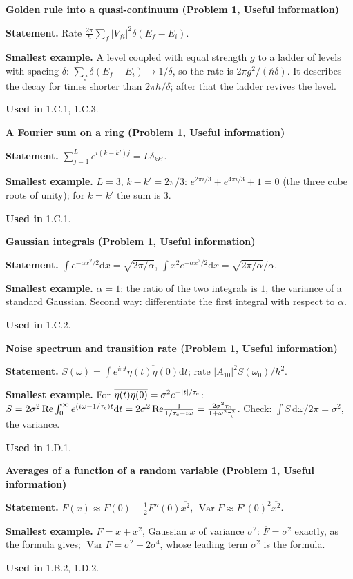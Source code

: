 \documentclass[11pt,a4paper]{article}
\newcommand{\dd}{\mathrm d}
\newcommand{\avg}[1]{\overline{#1}}
\newcommand{\Var}{\operatorname{Var}}
\newcommand{\smallheading}[1]{\par\Needspace{6\baselineskip}\medskip\textbf{#1}\par}
\begin{document}
\smallheading{Golden rule into a quasi-continuum (Problem 1, Useful information)}
\textbf{Statement.} Rate $\frac{2\pi}\hbar\sum_f|V_{fi}|^2\delta(E_f-E_i)$.\par
\textbf{Smallest example.} A level coupled with equal strength $g$ to a ladder of levels with spacing $\delta$: $\sum_f\delta(E_f-E_i)\to1/\delta$, so the rate is $2\pi g^2/(\hbar\delta)$. It describes the decay for times shorter than $2\pi\hbar/\delta$; after that the ladder revives the level.\par
\textbf{Used in} 1.C.1, 1.C.3.

\smallheading{A Fourier sum on a ring (Problem 1, Useful information)}
\textbf{Statement.} $\sum_{j=1}^Le^{i(k-k')j}=L\delta_{kk'}$.\par
\textbf{Smallest example.} $L=3$, $k-k'=2\pi/3$: $e^{2\pi i/3}+e^{4\pi i/3}+1=0$ (the three cube roots of unity); for $k=k'$ the sum is 3.\par
\textbf{Used in} 1.C.1.

\smallheading{Gaussian integrals (Problem 1, Useful information)}
\textbf{Statement.} $\int e^{-\alpha x^2/2}\dd x=\sqrt{2\pi/\alpha}$, $\int x^2e^{-\alpha x^2/2}\dd x=\sqrt{2\pi/\alpha}/\alpha$.\par
\textbf{Smallest example.} $\alpha=1$: the ratio of the two integrals is $1$, the variance of a standard Gaussian. Second way: differentiate the first integral with respect to $\alpha$.\par
\textbf{Used in} 1.C.2.

\smallheading{Noise spectrum and transition rate (Problem 1, Useful information)}
\textbf{Statement.} $S(\omega)=\int e^{i\omega t}\avg{\eta(t)\eta(0)}\dd t$; rate $|A_{10}|^2S(\omega_0)/\hbar^2$.\par
\textbf{Smallest example.} For $\avg{\eta(t)\eta(0)}=\sigma^2e^{-|t|/\tau_{\rm c}}$: $S=2\sigma^2\,\mathrm{Re}\int_0^\infty e^{(i\omega-1/\tau_{\rm c})t}\dd t=2\sigma^2\,\mathrm{Re}\frac1{1/\tau_{\rm c}-i\omega}=\frac{2\sigma^2\tau_{\rm c}}{1+\omega^2\tau_{\rm c}^2}$. Check: $\int S\,\dd\omega/2\pi=\sigma^2$, the variance.\par
\textbf{Used in} 1.D.1.

\smallheading{Averages of a function of a random variable (Problem 1, Useful information)}
\textbf{Statement.} $\avg{F(x)}\approx F(0)+\frac12F''(0)\avg{x^2}$, $\Var F\approx F'(0)^2\avg{x^2}$.\par
\textbf{Smallest example.} $F=x+x^2$, Gaussian $x$ of variance $\sigma^2$: $\avg F=\sigma^2$ exactly, as the formula gives; $\Var F=\sigma^2+2\sigma^4$, whose leading term $\sigma^2$ is the formula.\par
\textbf{Used in} 1.B.2, 1.D.2.
\end{document}
